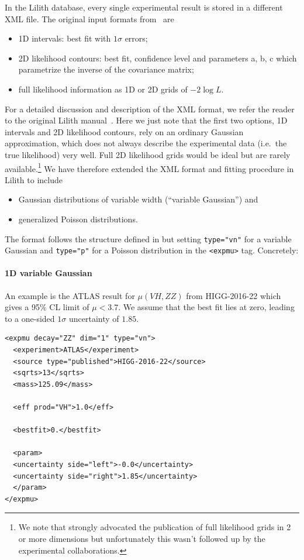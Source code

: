 \documentclass[submission, Phys]{SciPost}
\begin{document}
In the Lilith database, every single experimental result is stored in a different XML file. 
The original input formats from~\cite{Bernon:2015hsa} are 
\begin{itemize} 
\item 1D intervals: best fit with $1\sigma$ errors; 
\item 2D likelihood contours: best fit, confidence level and parameters a, b, c which parametrize the inverse of the covariance matrix;
\item full likelihood information as 1D or 2D grids of $-2\log L$.
\end{itemize}
For a detailed discussion and description of the XML format, we refer the reader to the original Lilith manual~\cite{Bernon:2015hsa}. 
Here we just note that the first two options, 1D intervals and 2D likelihood contours, rely on an ordinary Gaussian approximation, 
which does not always describe the experimental data (i.e.\ the true likelihood) very well. 
Full 2D likelihood grids would be ideal but are rarely available.\footnote{We note that \cite{Boudjema:2013qla} strongly advocated 
the publication of full likelihood grids in 2 or more dimensions but unfortunately this wasn't followed up by the experimental collaborations.} 
We have therefore extended the XML format and fitting procedure in Lilith to include 
\begin{itemize} 
\item Gaussian distributions of variable width (``variable Gaussian'') and 
\item generalized Poisson distributions. 
\end{itemize}
The format follows the structure defined in \cite{Bernon:2015hsa} but setting {\tt type="vn"} for a variable Gaussian and
{\tt type="p"} for a Poisson distribution in the {\tt <expmu>} tag. %
Concretely:

\paragraph{1D variable Gaussian} 

An example is the ATLAS result for $\mu(VH, ZZ)$ from HIGG-2016-22 which gives a 95\% CL limit of $\mu<3.7$. 
We assume that the best fit lies at zero, leading to a one-sided $1\sigma$ uncertainty of $1.85$. 

\begin{verbatim}
<expmu decay="ZZ" dim="1" type="vn">
  <experiment>ATLAS</experiment>
  <source type="published">HIGG-2016-22</source>
  <sqrts>13</sqrts>
  <mass>125.09</mass>

  <eff prod="VH">1.0</eff>

  <bestfit>0.</bestfit>
  
  <param>
  <uncertainty side="left">-0.0</uncertainty>
  <uncertainty side="right">1.85</uncertainty>
  </param>
</expmu>
\end{verbatim}
\end{document}
